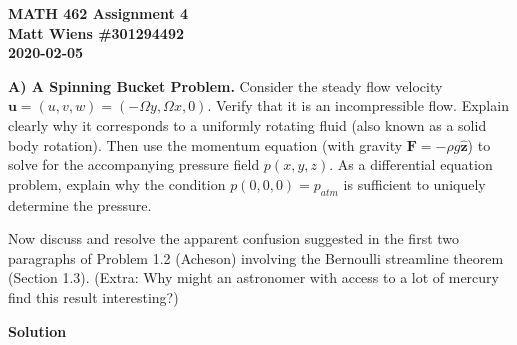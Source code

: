 \documentclass{article}
\def\*#1{\mathbf{#1}}
\newcommand{\zhat}{\mathbf{\hat{z}}}
\begin{document}
\textbf{MATH 462 Assignment 4} \\
\textbf{Matt Wiens \#301294492} \\
\textbf{2020-02-05}

\textbf{A) A Spinning Bucket Problem.}
Consider the steady flow velocity $\*u = (u, v, w) = (-\Omega y, \Omega x,
0)$. Verify that it is an incompressible flow. Explain clearly why it
corresponds to a uniformly rotating fluid (also known as a solid body
rotation). Then use the momentum equation (with gravity $\*F = - \rho g
\zhat$) to solve for the accompanying pressure field $p(x, y, z)$. As a
differential equation problem, explain why the condition $p(0, 0,
0) = p_{atm}$ is sufficient to uniquely determine the pressure.

Now discuss and resolve the apparent confusion suggested in the first
two paragraphs of Problem 1.2 (Acheson) involving the Bernoulli
streamline theorem (Section 1.3). (Extra: Why might an astronomer with
access to a lot of mercury find this result interesting?)

\textbf{Solution}
\end{document}

